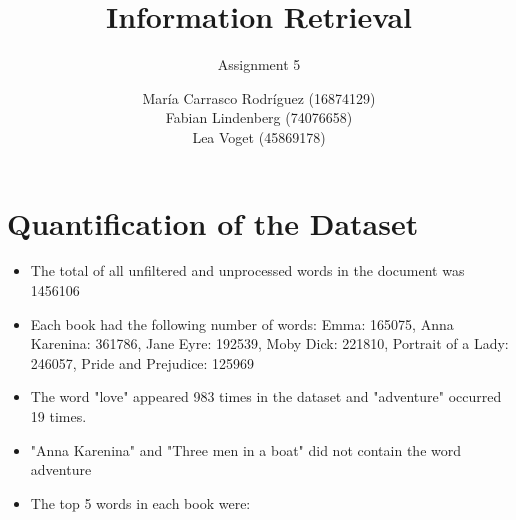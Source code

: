 \documentclass[a4paper,11pt,oneside]{book}
\title{Information Retrieval }
\subtitle{Assignment 5}
\author{ María Carrasco Rodríguez (16874129) \\
		Fabian Lindenberg (74076658)\\
		Lea Voget (45869178)}
\begin{document}
\kostspieligmaketitle


\chapter{Quantification of the Dataset}

\begin{itemize}
	\item{The total of all unfiltered and unprocessed words in the document was 1456106}
	\item{Each book had the following number of words: Emma: 165075, Anna Karenina: 361786, Jane Eyre: 192539, Moby Dick: 221810,  Portrait of a Lady: 246057, Pride and Prejudice: 125969}
	\item{The word "love" appeared 983 times in the dataset and "adventure" occurred 19 times.}
	\item{"Anna Karenina" and "Three men in a boat" did not contain the word adventure}
	\item{The top 5 words in each book were:
		}
\end{itemize}
\end{document}
